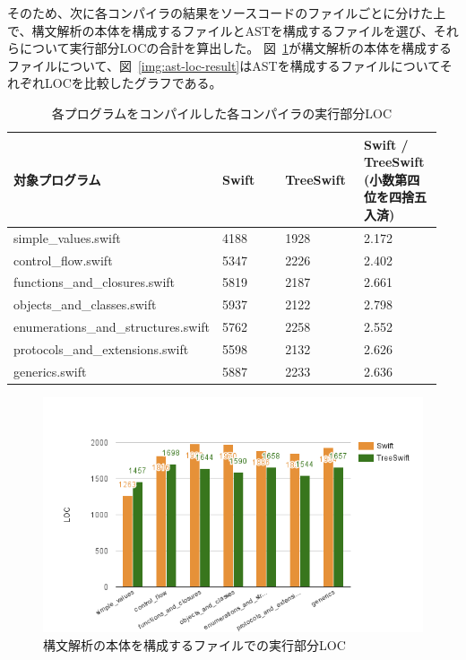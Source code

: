 そのため、次に各コンパイラの結果をソースコードのファイルごとに分けた上で、構文解析の本体を構成するファイルとASTを構成するファイルを選び、それらについて実行部分LOCの合計を算出した。
図~\ref{img:parse-loc-result}が構文解析の本体を構成するファイルについて、図~\ref{img:ast-loc-result}はASTを構成するファイルについてそれぞれLOCを比較したグラフである。

\begin{table}[!hbtp]
    \begin{center}
        \caption{各プログラムをコンパイルした各コンパイラの実行部分LOC}
        \begin{tabular}{|p{0.35\linewidth}|p{0.2\linewidth}|p{0.2\linewidth}|p{0.2\linewidth}|}
            \hline
            対象プログラム & Swift & TreeSwift & Swift / TreeSwift (小数第四位を四捨五入済)\\
            \hline
            \hline
            simple\_values.swift & 4188 & 1928 & 2.172\\
            \hline
            control\_flow.swift & 5347 & 2226 & 2.402\\
            \hline
            functions\_and\_closures.swift & 5819 & 2187 & 2.661\\
            \hline
            objects\_and\_classes.swift & 5937 & 2122 & 2.798\\
            \hline
            enumerations\_and\_structures.swift & 5762 & 2258 & 2.552\\
            \hline
            protocols\_and\_extensions.swift & 5598 & 2132 & 2.626\\
            \hline
            generics.swift & 5887 & 2233 & 2.636\\
            \hline
        \end{tabular}
        \label{table:loc-result}
    \end{center}
\end{table}

\begin{figure}
    \begin{center}
        \includegraphics[scale=0.8]{./img/parse_loc_result.png}
        \caption{構文解析の本体を構成するファイルでの実行部分LOC}
        \label{img:parse-loc-result}
    \end{center}
\end{figure}

